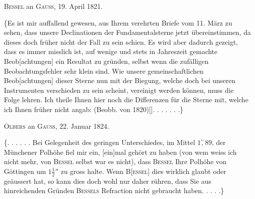 \begin{center}\textsc{Bessel} an \textsc{Gauss}, 19. April 1821.\end{center}
\noindent\hspace*{\parindent}\{Es ist mir auffallend gewesen, aus Ihrem verehrten Briefe vom 11. März zu sehen, dass unsere Declinationen der Fundamentalsterne jetzt übereinstimmen, da dieses doch früher nicht der Fall zu sein schien. Es wird aber dadurch gezeigt, dass es immer misslich ist, auf wenige und stets in  Jahreszeit gemachte Beob[achtungen] ein Resultat zu gründen, selbst wenn die zufälligen Beobachtungsfehler sehr klein sind. Wie unsere gemeinschaftlichen Beob[achtungen] dieser Sterne nun mit der Biegung, welche doch bei unseren Instrumenten verschieden zu sein scheint, vereinigt werden können, muss die Folge lehren. Ich theile Ihnen hier noch die Differenzen für die Sterne mit, welche ich Ihnen früher nicht angab: (Beobb. von 1820)[\begingroup\renewcommand{\thefootnote}{*)}\footnotemark\renewcommand{\thefootnote}{[*)}\footnotetext{Diese sind auf Seite 346 verwendet worden.]}\endgroup]. . . . . . .\}

\begin{center}\textsc{Olbers} an \textsc{Gauss}, 22. Januar 1824.\end{center}
\noindent\hspace*{\parindent}\{. . . . . . Bei Gelegenheit des geringen Unterschiedes, im Mittel \(1\overset{\prime\prime}{,}89\), der Münchener Polhöhe fiel mir ein, [ein]mal gehört zu haben (von wem weiss ich nicht mehr, von \textsc{Bessel} selbst war es nicht), dass \textsc{Bessel} Ihre Polhöhe von Göttingen um \(1\tfrac{1}{2}''\) zu gross halte. Wenn B[\textsc{essel}] dies wirklich glaubt oder geäussert hat, so kann dies doch wohl nur daher rühren, dass Sie aus hinreichenden Gründen \textsc{Bessels} Refraction nicht gebraucht haben. . . . .\}
\clearpage\endgroup
